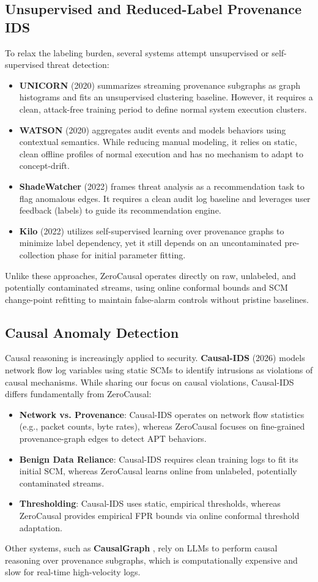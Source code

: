 \subsection{Unsupervised and Reduced-Label Provenance IDS}
To relax the labeling burden, several systems attempt unsupervised or self-supervised threat detection:
\begin{itemize}
\item \textbf{UNICORN} (2020) \cite{han2020unicorn} summarizes streaming provenance subgraphs as graph histograms and fits an unsupervised clustering baseline. However, it requires a clean, attack-free training period to define normal system execution clusters.
\item \textbf{WATSON} (2020) \cite{gao2020watson} aggregates audit events and models behaviors using contextual semantics. While reducing manual modeling, it relies on static, clean offline profiles of normal execution and has no mechanism to adapt to concept-drift.
\item \textbf{ShadeWatcher} (2022) \cite{yang2022shadewatcher} frames threat analysis as a recommendation task to flag anomalous edges. It requires a clean audit log baseline and leverages user feedback (labels) to guide its recommendation engine.
\item \textbf{Kilo} (2022) \cite{kilo2022} utilizes self-supervised learning over provenance graphs to minimize label dependency, yet it still depends on an uncontaminated pre-collection phase for initial parameter fitting.
\end{itemize}
Unlike these approaches, ZeroCausal operates directly on raw, unlabeled, and potentially contaminated streams, using online conformal bounds and SCM change-point refitting to maintain false-alarm controls without pristine baselines.

\subsection{Causal Anomaly Detection}
Causal reasoning is increasingly applied to security. \textbf{Causal-IDS} (2026) \cite{causalids2026} models network flow log variables using static SCMs to identify intrusions as violations of causal mechanisms. While sharing our focus on causal violations, Causal-IDS differs fundamentally from ZeroCausal:
\begin{itemize}
\item \textbf{Network vs. Provenance}: Causal-IDS operates on network flow statistics (e.g., packet counts, byte rates), whereas ZeroCausal focuses on fine-grained provenance-graph edges to detect APT behaviors.
\item \textbf{Benign Data Reliance}: Causal-IDS requires clean training logs to fit its initial SCM, whereas ZeroCausal learns online from unlabeled, potentially contaminated streams.
\item \textbf{Thresholding}: Causal-IDS uses static, empirical thresholds, whereas ZeroCausal provides empirical FPR bounds via online conformal threshold adaptation.
\end{itemize}

Other systems, such as \textbf{CausalGraph} \cite{causalgraph2026}, rely on LLMs to perform causal reasoning over provenance subgraphs, which is computationally expensive and slow for real-time high-velocity logs.
